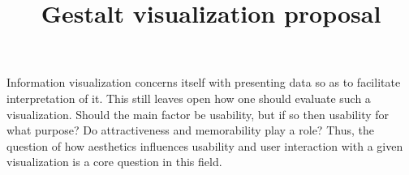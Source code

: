 \documentclass[12pt, twocolumn]{article}
\title{\vspace{-.5in}Gestalt visualization proposal}
\author{} %
\date{\vspace{-.7in}}
\begin{document}
\maketitle

Information visualization concerns itself with presenting data so as to facilitate interpretation of it. 
This still leaves open how one should evaluate such a visualization. 
Should the main factor be usability, but if so then usability for what purpose?
Do attractiveness and memorability play a role?
Thus, the question of how aesthetics influences usability and user interaction with a given visualization is a core question in this field. 
\\
\end{document}
